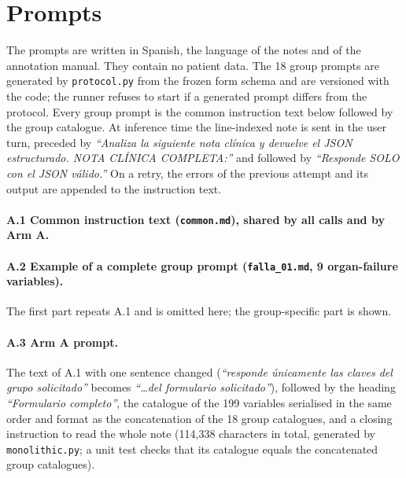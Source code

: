 \section{Prompts}\label{app:prompts}

The prompts are written in Spanish, the language of the notes and of the annotation manual. They contain no
patient data. The 18 group prompts are generated by \texttt{protocol.py} from the frozen form schema and are
versioned with the code; the runner refuses to start if a generated prompt differs from the protocol. Every
group prompt is the common instruction text below followed by the group catalogue. At inference time the
line-indexed note is sent in the user turn, preceded by \emph{``Analiza la siguiente nota clínica y devuelve el
JSON estructurado. NOTA CLÍNICA COMPLETA:''} and followed by \emph{``Responde SOLO con el JSON válido.''} On a
retry, the errors of the previous attempt and its output are appended to the instruction text.

\paragraph{A.1 Common instruction text (\texttt{common.md}), shared by all calls and by Arm A.}


\paragraph{A.2 Example of a complete group prompt (\texttt{falla\_01.md}, 9 organ-failure variables).} The
first part repeats A.1 and is omitted here; the group-specific part is shown.


\paragraph{A.3 Arm A prompt.} The text of A.1 with one sentence changed (\emph{``responde únicamente las claves del
grupo solicitado''} becomes \emph{``\ldots del formulario solicitado''}), followed by the heading \emph{``Formulario
completo''}, the catalogue of the 199 variables serialised in the same order and format as the concatenation of the
18 group catalogues, and a closing instruction to read the whole note (114{,}338 characters in total, generated by
\texttt{monolithic.py}; a unit test checks that its catalogue equals the concatenated group catalogues).

